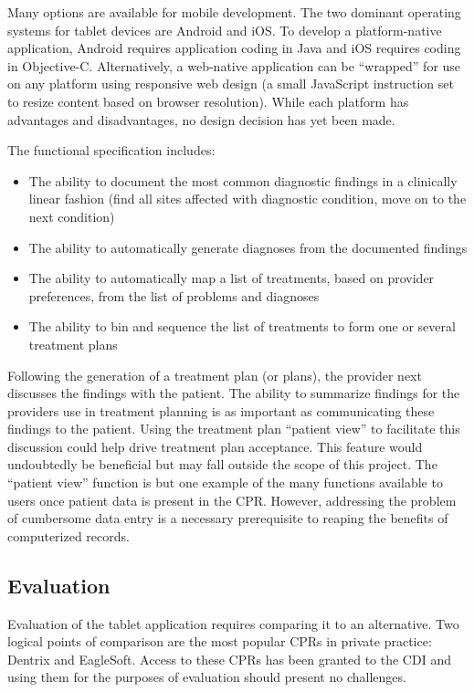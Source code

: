 \documentclass[11pt]{article}
\begin{document}
Many options are available for mobile development. The two dominant operating systems for tablet devices are Android and iOS. To develop a platform-native application, Android requires application coding in Java and iOS requires coding in Objective-C. Alternatively, a web-native application can be ``wrapped'' for use on any platform using responsive web design (a small JavaScript instruction set to resize content based on browser resolution). While each platform has advantages and disadvantages, no design decision has yet been made.

The functional specification includes:

\begin{itemize}
\item The ability to document the most common diagnostic findings in a clinically linear fashion (find all sites affected with diagnostic condition, move on to the next condition)
\item The ability to automatically generate diagnoses from the documented findings
\item The ability to automatically map a list of treatments, based on provider preferences, from the list of problems and diagnoses
\item The ability to bin and sequence the list of treatments to form one or several treatment plans
\end{itemize}

Following the generation of a treatment plan (or plans), the provider next discusses the findings with the patient. The ability to summarize findings for the providers use in treatment planning is as important as communicating these findings to the patient. Using the treatment plan ``patient view'' to facilitate this discussion could help drive treatment plan acceptance. This feature would undoubtedly be beneficial but may fall outside the scope of this project. The ``patient view'' function is but one example of the many functions available to users once patient data is present in the CPR. However, addressing the problem of cumbersome data entry is a necessary prerequisite to reaping the benefits of computerized records.

\subsection{Evaluation}

Evaluation of the tablet application requires comparing it to an alternative. Two logical points of comparison are the most popular CPRs in private practice: Dentrix and EagleSoft. Access to these CPRs has been granted to the CDI and using them for the purposes of evaluation should present no challenges.
\end{document}
